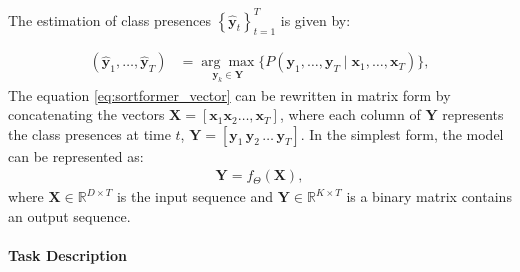 \documentclass{article}
\begin{document}
The estimation of class presences $\left\{\hat{\mathbf{y}}_t\right\}_{t=1}^T$ is given by:

\begin{align}
  (\hat{\mathbf{y}}_1, \ldots, \hat{\mathbf{y}}_T) & = \underset{\mathbf{y}_k \in \mathbf{Y}}{\arg\max} \big\{ P\left(\mathbf{y}_1, \ldots, \mathbf{y}_T \mid \mathbf{x}_1, \ldots, \mathbf{x}_T\right) \big\},
  \label{eq:sortformer_vector}
\end{align}
The equation \ref{eq:sortformer_vector} can be rewritten in matrix form by concatenating the vectors $ \mathbf{X} = [ \mathbf{x}_1 \mathbf{x}_2 \ldots, \mathbf{x}_T ] $,
where each column of $\mathbf{Y}$ represents the class presences at time $t$, $ \mathbf{Y} = [\mathbf{y}_1 \, \mathbf{y}_2 \, \ldots \, \mathbf{y}_T]$.
In the simplest form, the model can be represented as:
\begin{align}
\mathbf{Y} = f_{\Theta}\left(\mathbf{X}\right),
\end{align}
where \( \mathbf{X} \in \mathbb{R}^{D \times T} \) is the input sequence and \( \mathbf{Y} \in \mathbb{R}^{K \times T} \) is a binary matrix contains an output sequence. 

\paragraph{Task Description}

\end{document}
